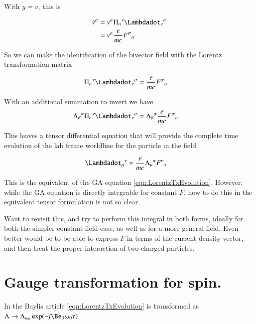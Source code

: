 \documentclass{article}
\newcommand{\ILambda}[0]{\Pi}
\begin{document}
With $y = v$, this is

\begin{align*}
\vdot^\sigma 
&= v^\alpha {\ILambda_\alpha}^\nu {\Lambdadot_\nu}^\sigma \\
&= v^\alpha \frac{e}{m c} {F^\sigma}_\alpha 
\end{align*}

So we can make the identification of the bivector field with the Lorentz transformation matrix

\begin{align*}
{\ILambda_\alpha}^\nu {\Lambdadot_\nu}^\sigma &= \frac{e}{m c} {F^\sigma}_\alpha 
\end{align*}

With an additional summation to invert we have
\begin{align*}
{\Lambda_\beta}^\alpha {\ILambda_\alpha}^\nu {\Lambdadot_\nu}^\sigma &= {\Lambda_\beta}^\alpha \frac{e}{m c} {F^\sigma}_\alpha 
\end{align*}

This leaves a tensor differential equation that will provide the complete time evolution of the lab frame worldline for the particle in the field

\begin{align}
{{\Lambdadot}_\mu}^\nu &= \frac{e}{m c} {\Lambda_\mu}^\alpha {F^\nu}_\alpha 
\end{align}

This is the equivalent of the GA equation \ref{eqn:LorentzTxEvolution}.  However, while the GA equation is directly integrable for constant $F$, how to do this in the equivalent tensor formulation is not so clear.

Want to revisit this, and try to perform this integral in both forms, ideally
for both the simpler constant field case, as well as for a more general field.
Even better would be to be able to express $F$ in terms of the current 
density vector, and then treat the proper interaction of two charged particles.

\section{ Gauge transformation for spin. }

In the Baylis article \ref{eqn:LorentzTxEvolution} is transformed as
$\Lambda \rightarrow \Lambda_{\omega_0} \exp( -i \Be_3 \omega_0 \tau)$.
\end{document}
